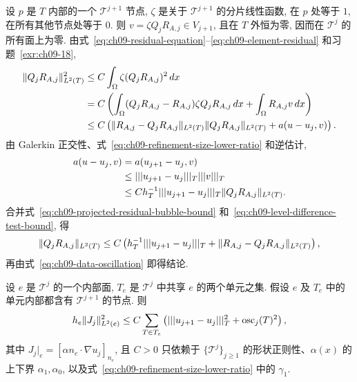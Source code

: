 \begin{Proof}
设 $p$ 是 $T$ 内部的一个 $\mathcal T^{j+1}$ 节点, $\zeta$ 是关于 $\mathcal T^{j+1}$ 的分片线性函数, 在 $p$ 处等于 $1$, 在所有其他节点处等于 $0$. 则 $v=\zeta Q_jR_{A,j}\in V_{j+1}$, 且在 $T$ 外恒为零, 因而在 $\mathcal T^j$ 的所有面上为零. 由式~\eqref{eq:ch09-residual-equation}--\eqref{eq:ch09-element-residual} 和习题~\ref{exr:ch09-18},
\begin{align}
\MathBookFormulaID{formula-ch09-projected-residual-bubble-bound}
\label{eq:ch09-projected-residual-bubble-bound}
\|Q_jR_{A,j}\|_{L^2(T)}^2
&\leq C\int_\Omega\zeta(Q_jR_{A,j})^2\,dx\notag\\
&=C\left(\int_\Omega(Q_jR_{A,j}-R_{A,j})\zeta Q_jR_{A,j}\,dx
+\int_\Omega R_{A,j}v\,dx\right)\notag\\
&\leq C\left(\|R_{A,j}-Q_jR_{A,j}\|_{L^2(T)}
\|Q_jR_{A,j}\|_{L^2(T)}+a(u-u_j,v)\right).
\end{align}
由 Galerkin 正交性、式~\eqref{eq:ch09-refinement-size-lower-ratio} 和逆估计,
\begin{align}
\MathBookFormulaID{formula-ch09-level-difference-test-bound}
\label{eq:ch09-level-difference-test-bound}
a(u-u_j,v)
&=a(u_{j+1}-u_j,v)\notag\\
&\leq|||u_{j+1}-u_j|||_T|||v|||_T\notag\\
&\leq Ch_T^{-1}|||u_{j+1}-u_j|||_T\|Q_jR_{A,j}\|_{L^2(T)}.
\end{align}
合并式~\eqref{eq:ch09-projected-residual-bubble-bound} 和~\eqref{eq:ch09-level-difference-test-bound}, 得
\[
\MathBookFormulaID{formula-ch09-projected-residual-final-bound}
\|Q_jR_{A,j}\|_{L^2(T)}
\leq C\left(h_T^{-1}|||u_{j+1}-u_j|||_T
+\|R_{A,j}-Q_jR_{A,j}\|_{L^2(T)}\right),
\]
再由式~\eqref{eq:ch09-data-oscillation} 即得结论.
\end{Proof}

\begin{Lemma}
\label{lem:ch09-face-jump-reduction}
设 $e$ 是 $\mathcal T^j$ 的一个内部面, $T_e$ 是 $\mathcal T^j$ 中共享 $e$ 的两个单元之集. 假设 $e$ 及 $T_e$ 中的单元内部都含有 $\mathcal T^{j+1}$ 的节点. 则
\begin{equation}
\MathBookFormulaID{formula-ch09-face-jump-reduction}
\label{eq:ch09-face-jump-reduction}
h_e\|J_j\|_{L^2(e)}^2
\leq C\sum_{T\in T_e}
\left(|||u_{j+1}-u_j|||_T^2+\operatorname{osc}_j(T)^2\right),
\end{equation}
其中 $J_j|_e=[\alpha n_e\cdot\nabla u_j]_{n_e}$, 且 $C>0$ 只依赖于 $\{\mathcal T^j\}_{j\geq1}$ 的形状正则性、$\alpha(x)$ 的上下界 $\alpha_1,\alpha_0$, 以及式~\eqref{eq:ch09-refinement-size-lower-ratio} 中的 $\gamma_1$.
\end{Lemma}

